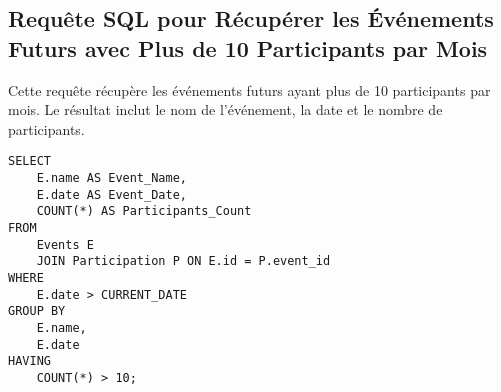 \subsection{Requête SQL pour Récupérer les Événements Futurs avec Plus de 10 Participants par Mois}

Cette requête récupère les événements futurs ayant plus de 10 participants par mois. Le résultat inclut le nom de l'événement, la date et le nombre de participants.

\begin{lstlisting}
SELECT
    E.name AS Event_Name,
    E.date AS Event_Date,
    COUNT(*) AS Participants_Count
FROM
    Events E
    JOIN Participation P ON E.id = P.event_id
WHERE
    E.date > CURRENT_DATE
GROUP BY
    E.name,
    E.date
HAVING
    COUNT(*) > 10;
\end{lstlisting}